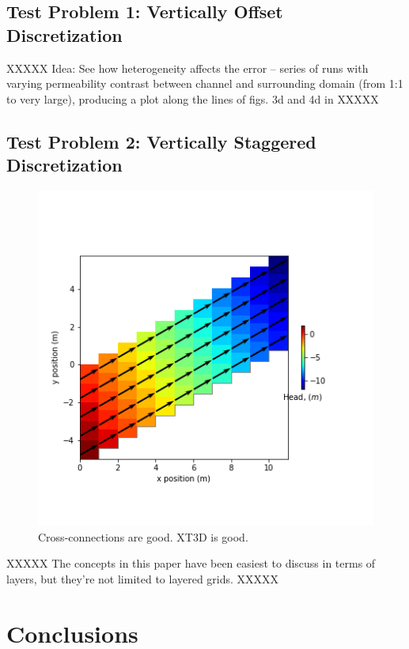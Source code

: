 \documentclass{article}
\begin{document}
\subsection{Test Problem 1: Vertically Offset Discretization}

XXXXX Idea: See how heterogeneity affects the error -- series of runs with varying permeability contrast between channel and surrounding domain (from 1:1 to very large), producing a plot along the lines of figs. 3d and 4d in \cite{bardot2022} XXXXX

\subsection{Test Problem 2: Vertically Staggered Discretization}

\begin{figure}[H]
	\begin{center}
	\includegraphics[scale=0.5]{../figures/disu-x-cc-head.png}
	\caption{Cross-connections are good. XT3D is good.}
	\label{fig:mymodel-head}
	\end{center}
\end{figure}

XXXXX The concepts in this paper have been easiest to discuss in terms of layers, but they're not limited to layered grids. XXXXX

\section{Conclusions}
\end{document}
